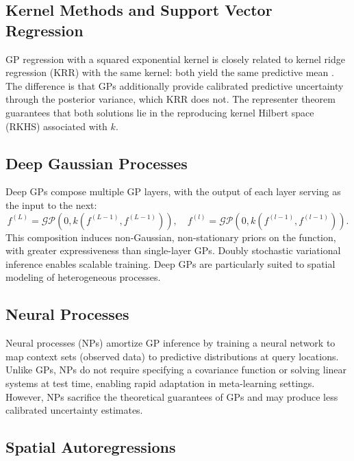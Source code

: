 \documentclass[conference]{IEEEtran}
\begin{document}
\subsection{Kernel Methods and Support Vector Regression}

GP regression with a squared exponential kernel is closely related to kernel ridge regression (KRR) with the same kernel: both yield the same predictive mean \cite{rasmussen2006gaussian}. The difference is that GPs additionally provide calibrated predictive uncertainty through the posterior variance, which KRR does not. The representer theorem guarantees that both solutions lie in the reproducing kernel Hilbert space (RKHS) associated with $k$.

\subsection{Deep Gaussian Processes}

Deep GPs \cite{damianou2013deep} compose multiple GP layers, with the output of each layer serving as the input to the next:
\begin{equation}
  f^{(L)} = \mathcal{GP}(0, k(f^{(L-1)}, f^{(L-1)})), \quad f^{(l)} = \mathcal{GP}(0, k(f^{(l-1)}, f^{(l-1)})).
  \label{eq:deep_gp}
\end{equation}
This composition induces non-Gaussian, non-stationary priors on the function, with greater expressiveness than single-layer GPs. Doubly stochastic variational inference \cite{salimbeni2017doubly} enables scalable training. Deep GPs are particularly suited to spatial modeling of heterogeneous processes.

\subsection{Neural Processes}

Neural processes (NPs) \cite{garnelo2018neural} amortize GP inference by training a neural network to map context sets (observed data) to predictive distributions at query locations. Unlike GPs, NPs do not require specifying a covariance function or solving linear systems at test time, enabling rapid adaptation in meta-learning settings. However, NPs sacrifice the theoretical guarantees of GPs and may produce less calibrated uncertainty estimates.

\subsection{Spatial Autoregressions}
\end{document}
